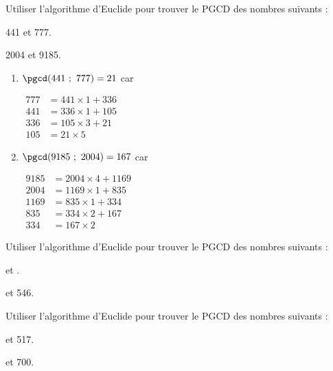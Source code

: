 \documentclass{cornouaille}
\begin{document}
\begin{colonne*exercice}

\begin{exercice*}
  \label{exo-alg_euclide}
  Utiliser l’algorithme d’Euclide pour trouver le PGCD des nombres
  suivants :
\begin{colenumerate}{2}
\item 441 et 777. 
\item 2004 et 9185.
\end{colenumerate}
\end{exercice*}
\begin{corrige}
  \begin{enumerate}
\item $\pgcd(441\ ;\ 777)=21$ car

$\begin{aligned}
777&=441\times1+336\\
441&=336\times1+105\\
336&=105\times3+21\\
105&=21\times5\end{aligned}$\medskip

\item $\pgcd(9185\ ;\ 2004)=167$ car

$\begin{aligned}
9185&=2004\times4+1169\\
2004&=1169\times1+835\\
1169&=835\times1+334\\
835&=334\times2+167\\
334&=167\times2\end{aligned}$
\end{enumerate}
\end{corrige}

\begin{exercice}
  Utiliser l’algorithme d’Euclide pour trouver le PGCD des nombres
  suivants :
\begin{colenumerate}{2}
\item {} et . 
\item {} et 546.
\end{colenumerate}
\end{exercice}

\begin{exercice}
  Utiliser l’algorithme d’Euclide pour trouver le PGCD des nombres
  suivants :
\begin{colenumerate}{2}
\item {} et 517. 
\item {} et 700.
\end{colenumerate}
\end{exercice}


\end{colonne*exercice}
\end{document}
